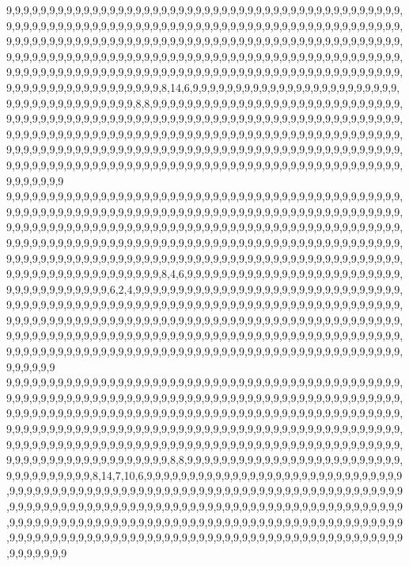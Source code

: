 9,9,9,9,9,9,9,9,9,9,9,9,9,9,9,9,9,9,9,9,9,9,9,9,9,9,9,9,9,9,9,9,9,9,9,9,9,9,9,9,9,9,9,9,9,9,9,9,9,9,9,9,9,9,9,9,9,9,9,9,9,9,9,9,9,9,9,9,9,9,9,9,9,9,9,9,9,9,9,9,9,9,9,9,9,9,9,9,9,9,9,9,9,9,9,9,9,9,9,9,9,9,9,9,9,9,9,9,9,9,9,9,9,9,9,9,9,9,9,9,9,9,9,9,9,9,9,9,9,9,9,9,9,9,9,9,9,9,9,9,9,9,9,9,9,9,9,9,9,9,9,9,9,9,9,9,9,9,9,9,9,9,9,9,9,9,9,9,9,9,9,9,9,9,9,9,9,9,9,9,9,9,9,9,9,9,9,9,9,9,9,9,9,9,9,9,9,9,9,9,9,9,9,9,9,9,9,9,9,9,9,9,9,9,9,9,9,9,9,9,9,9,9,9,9,9,9,9,9,9,9,9,9,9,9,9,9,9,9,9,9,9,9,9,9,9,9,9,8,14,6,9,9,9,9,9,9,9,9,9,9,9,9,9,9,9,9,9,9,9,9,9,9,9,9,9,9,9,9,9,9,9,9,9,9,9,9,9,9,9,8,8,9,9,9,9,9,9,9,9,9,9,9,9,9,9,9,9,9,9,9,9,9,9,9,9,9,9,9,9,9,9,9,9,9,9,9,9,9,9,9,9,9,9,9,9,9,9,9,9,9,9,9,9,9,9,9,9,9,9,9,9,9,9,9,9,9,9,9,9,9,9,9,9,9,9,9,9,9,9,9,9,9,9,9,9,9,9,9,9,9,9,9,9,9,9,9,9,9,9,9,9,9,9,9,9,9,9,9,9,9,9,9,9,9,9,9,9,9,9,9,9,9,9,9,9,9,9,9,9,9,9,9,9,9,9,9,9,9,9,9,9,9,9,9,9,9,9,9,9,9,9,9,9,9,9,9,9,9,9,9,9,9,9,9,9,9,9,9,9,9,9,9,9,9,9,9,9,9,9,9,9,9,9,9,9,9,9,9,9,9,9,9,9,9,9,9,9,9,9,9,9,9,9,9,9,9,9,9,9,9,9,9,9,9,9,9,9,9,9,9,9
9,9,9,9,9,9,9,9,9,9,9,9,9,9,9,9,9,9,9,9,9,9,9,9,9,9,9,9,9,9,9,9,9,9,9,9,9,9,9,9,9,9,9,9,9,9,9,9,9,9,9,9,9,9,9,9,9,9,9,9,9,9,9,9,9,9,9,9,9,9,9,9,9,9,9,9,9,9,9,9,9,9,9,9,9,9,9,9,9,9,9,9,9,9,9,9,9,9,9,9,9,9,9,9,9,9,9,9,9,9,9,9,9,9,9,9,9,9,9,9,9,9,9,9,9,9,9,9,9,9,9,9,9,9,9,9,9,9,9,9,9,9,9,9,9,9,9,9,9,9,9,9,9,9,9,9,9,9,9,9,9,9,9,9,9,9,9,9,9,9,9,9,9,9,9,9,9,9,9,9,9,9,9,9,9,9,9,9,9,9,9,9,9,9,9,9,9,9,9,9,9,9,9,9,9,9,9,9,9,9,9,9,9,9,9,9,9,9,9,9,9,9,9,9,9,9,9,9,9,9,9,9,9,9,9,9,9,9,9,9,9,9,9,9,9,9,9,9,8,4,6,9,9,9,9,9,9,9,9,9,9,9,9,9,9,9,9,9,9,9,9,9,9,9,9,9,9,9,9,9,9,9,9,9,9,9,9,9,6,2,4,9,9,9,9,9,9,9,9,9,9,9,9,9,9,9,9,9,9,9,9,9,9,9,9,9,9,9,9,9,9,9,9,9,9,9,9,9,9,9,9,9,9,9,9,9,9,9,9,9,9,9,9,9,9,9,9,9,9,9,9,9,9,9,9,9,9,9,9,9,9,9,9,9,9,9,9,9,9,9,9,9,9,9,9,9,9,9,9,9,9,9,9,9,9,9,9,9,9,9,9,9,9,9,9,9,9,9,9,9,9,9,9,9,9,9,9,9,9,9,9,9,9,9,9,9,9,9,9,9,9,9,9,9,9,9,9,9,9,9,9,9,9,9,9,9,9,9,9,9,9,9,9,9,9,9,9,9,9,9,9,9,9,9,9,9,9,9,9,9,9,9,9,9,9,9,9,9,9,9,9,9,9,9,9,9,9,9,9,9,9,9,9,9,9,9,9,9,9,9,9,9,9,9,9,9,9,9,9,9,9,9,9,9,9,9,9,9,9,9,9,9
9,9,9,9,9,9,9,9,9,9,9,9,9,9,9,9,9,9,9,9,9,9,9,9,9,9,9,9,9,9,9,9,9,9,9,9,9,9,9,9,9,9,9,9,9,9,9,9,9,9,9,9,9,9,9,9,9,9,9,9,9,9,9,9,9,9,9,9,9,9,9,9,9,9,9,9,9,9,9,9,9,9,9,9,9,9,9,9,9,9,9,9,9,9,9,9,9,9,9,9,9,9,9,9,9,9,9,9,9,9,9,9,9,9,9,9,9,9,9,9,9,9,9,9,9,9,9,9,9,9,9,9,9,9,9,9,9,9,9,9,9,9,9,9,9,9,9,9,9,9,9,9,9,9,9,9,9,9,9,9,9,9,9,9,9,9,9,9,9,9,9,9,9,9,9,9,9,9,9,9,9,9,9,9,9,9,9,9,9,9,9,9,9,9,9,9,9,9,9,9,9,9,9,9,9,9,9,9,9,9,9,9,9,9,9,9,9,9,9,9,9,9,9,9,9,9,9,9,9,9,9,9,9,9,9,9,9,9,9,9,9,9,9,9,9,9,9,9,9,8,8,9,9,9,9,9,9,9,9,9,9,9,9,9,9,9,9,9,9,9,9,9,9,9,9,9,9,9,9,9,9,9,9,9,9,9,8,14,7,10,6,9,9,9,9,9,9,9,9,9,9,9,9,9,9,9,9,9,9,9,9,9,9,9,9,9,9,9,9,9,9,9,9,9,9,9,9,9,9,9,9,9,9,9,9,9,9,9,9,9,9,9,9,9,9,9,9,9,9,9,9,9,9,9,9,9,9,9,9,9,9,9,9,9,9,9,9,9,9,9,9,9,9,9,9,9,9,9,9,9,9,9,9,9,9,9,9,9,9,9,9,9,9,9,9,9,9,9,9,9,9,9,9,9,9,9,9,9,9,9,9,9,9,9,9,9,9,9,9,9,9,9,9,9,9,9,9,9,9,9,9,9,9,9,9,9,9,9,9,9,9,9,9,9,9,9,9,9,9,9,9,9,9,9,9,9,9,9,9,9,9,9,9,9,9,9,9,9,9,9,9,9,9,9,9,9,9,9,9,9,9,9,9,9,9,9,9,9,9,9,9,9,9,9,9,9,9,9,9,9,9,9,9,9,9,9,9,9,9,9,9,9
